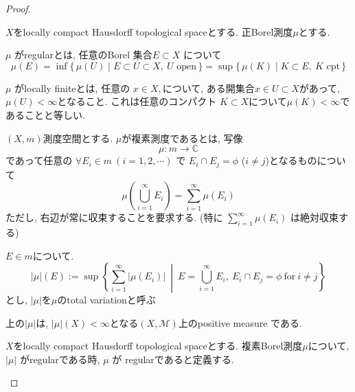 \begin{proof}
\begin{tcolorbox}[mybox]
\begin{defn}
\label{defn-M-4.2.7}
$X$をlocally compact Hausdorff topological spaceとする. 
正Borel測度\( \mu \)とする. 

\( \mu \) がregularとは, 
任意のBorel 集合\( E\subset X \) について
\[
\mu(E)=\inf\{\,\mu(U)\mid E\subset U\subset X,\ U \text{ open}\,\}
=\sup\{\,\mu(K)\mid K\subset E,\ K \text{ cpt}\,\}
\]

\( \mu \) がlocally finiteとは, 
任意の
\( x\in X,\)について, ある開集合\( x\in  U\subset X \)があって, 
\(\mu(U)<\infty
\)となること. 
これは任意のコンパクト
\(K\subset X \)について\(\mu(K)<\infty\)であることと等しい. 
\end{defn}
\end{tcolorbox}


\begin{tcolorbox}[mybox]
\begin{defn}
\label{defn-M-4.2.8}
 $(X, m )$測度空間とする. 
$\mu$が複素測度であるとは, 写像
\[
\mu: m \to \mathbb{C}
\]
であって任意の
 $\forall E_i\in m\ (i=1,2,\cdots)$ で $E_i\cap E_j=\phi$ ($i\neq j$)となるものについて
 $$
 \mu\left(\bigcup_{i=1}^{\infty} E_i\right)=\sum_{i=1}^{\infty}\mu(E_i)
 $$
ただし, 右辺が常に収束することを要求する.
(特に $\sum_{i=1}^{\infty}\mu(E_i)$ は絶対収束する)

$E\in m$について. 
\[
|\mu|(E):=\sup\left\{\sum_{i=1}^{\infty}|\mu(E_i)|\ \middle|\ E=\bigcup_{i=1}^{\infty}E_i,\ 
E_i\cap E_j=\phi \ \text{for}\ i\neq j\right\}
\]
とし, 
$|\mu|$を$\mu$のtotal variationと呼ぶ

\end{defn}
\end{tcolorbox}

\begin{tcolorbox}[mybox]
\begin{thm}\cite[Theorem 6.2, 6.4]{Rud2}
\label{thm-M-4.2.9}
上の$|\mu|$は, $|\mu|(X)<\infty$となる$(X,\mathcal{M})$上のpositive measure である. 
\end{thm}
\end{tcolorbox}

\begin{tcolorbox}[mybox]
\begin{defn} 
\label{defn-M-4.2.10}
$X$をlocally compact Hausdorff topological spaceとする. 
複素Borel測度$\mu$について, $|\mu|$ がregularである時, 
$\mu$ が regularであると定義する. 
\end{defn}
\end{tcolorbox}


\end{proof}
